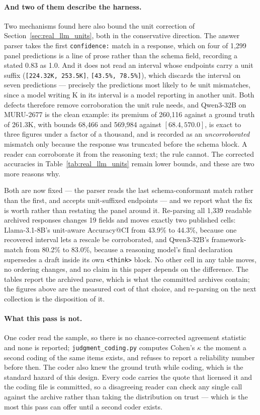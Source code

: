 \documentclass{article}
\begin{document}
\paragraph{And two of them describe the harness.} Two mechanisms found here also bound the unit correction of Section~\ref{sec:real_llm_units}, both in the conservative direction. The answer parser takes the first \texttt{confidence:} match in a response, which on four of 1{,}299 panel predictions is a line of prose rather than the schema field, recording a stated 0.83 as 1.0. And it does not read an interval whose endpoints carry a unit suffix (\texttt{[224.32K, 253.5K]}, \texttt{[43.5\%, 78.5\%]}), which discards the interval on seven predictions --- precisely the predictions most likely to \emph{be} unit mismatches, since a model writing K in its interval is a model reporting in another unit. Both defects therefore remove corroboration the unit rule needs, and Qwen3-32B on MURU-2677 is the clean example: its premium of 260{,}116 against a ground truth of 261.3K, with bounds 68{,}466 and 569{,}984 against $[68.4, 570.0]$, is exact to three figures under a factor of a thousand, and is recorded as an \emph{uncorroborated} mismatch only because the response was truncated before the schema block. A reader can corroborate it from the reasoning text; the rule cannot. The corrected accuracies in Table~\ref{tab:real_llm_units} remain lower bounds, and these are two more reasons why.

Both are now fixed --- the parser reads the last schema-conformant match rather than the first, and accepts unit-suffixed endpoints --- and we report what the fix is worth rather than restating the panel around it. Re-parsing all 1{,}339 readable archived responses changes 19 fields and moves exactly two published cells: Llama-3.1-8B's unit-aware Accuracy@CI from 43.9\% to 44.3\%, because one recovered interval lets a rescale be corroborated, and Qwen3-32B's framework-match from 80.2\% to 83.0\%, because a reasoning model's final declaration supersedes a draft inside its own \texttt{<think>} block. No other cell in any table moves, no ordering changes, and no claim in this paper depends on the difference. The tables report the archived parse, which is what the committed archives contain; the figures above are the measured cost of that choice, and re-parsing on the next collection is the disposition of it.

\paragraph{What this pass is not.} One coder read the sample, so there is no chance-corrected agreement statistic and none is reported; \texttt{judgment\_coding.py} computes Cohen's $\kappa$ the moment a second coding of the same items exists, and refuses to report a reliability number before then. The coder also knew the ground truth while coding, which is the standard hazard of this design. Every code carries the quote that licensed it and the coding file is committed, so a disagreeing reader can check any single call against the archive rather than taking the distribution on trust --- which is the most this pass can offer until a second coder exists.
\end{document}
